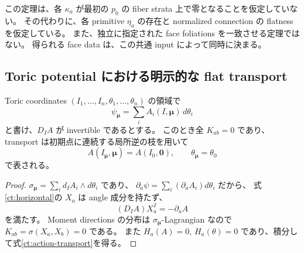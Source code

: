 この定理は、各 $\kappa_a$ が最初の $p_0$ の fiber strata 上で零となることを仮定していない。
その代わりに、各 primitive $\eta_a$ の存在と normalized connection の flatness を仮定している。
また、独立に指定された face foliations を一致させる定理ではない。
得られる face data は、この共通 input によって同時に決まる。

\subsection{Toric potential における明示的な flat transport}
\label{ct:toric}

\begin{proposition}
\label{ct:toric-flatness}
Toric coordinates $(I_1,\ldots,I_n,\theta_1,\ldots,\theta_n)$ の領域で
\begin{equation}\label{ct:toric-potential}
 \psi_{\boldsymbol\mu}
       =\sum_i A_i(I,\boldsymbol\mu)\,d\theta_i
\end{equation}
と書け、$D_IA$ が invertible であるとする。
このとき全 $K_{ab}=0$ であり、transport は初期点に連続する局所逆の枝を用いて
\begin{equation}\label{ct:action-transport}
 A(I_{\boldsymbol\mu},\boldsymbol\mu)=A(I_0,\boldsymbol0),
 \qquad \theta_{\boldsymbol\mu}=\theta_0
\end{equation}
で表される。
\end{proposition}

\begin{proof}
$\sigma_{\boldsymbol\mu}=\sum_i d_IA_i\wedge d\theta_i$ であり、
$\partial_a\psi=\sum_i(\partial_aA_i)d\theta_i$ だから、
式\eqref{ct:horizontal}の $X_a$ は angle 成分を持たず、
\[
 (D_IA)X_a^I=-\partial_aA
\]
を満たす。
Moment directions の分布は $\sigma_{\boldsymbol\mu}$-Lagrangian なので
$K_{ab}=\sigma(X_a,X_b)=0$ である。
また $H_a(A)=0$, $H_a(\theta)=0$ であり、積分して式\eqref{ct:action-transport}を得る。
\end{proof}

